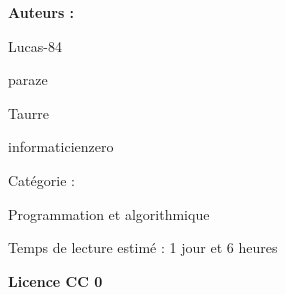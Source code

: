 \begin{titlepage}
\parindent=0pt
\vspace*{9cm}
\begin{center}\sffamily\bfseries\LARGE
Auteurs :


    Lucas-84
    
    paraze
    
    Taurre
    
    informaticienzero
    
\end{center}

\vspace*{6cm}

\begin{center}\sffamily\bfseries\Large

Catégorie :

    Programmation et algorithmique 


Temps de lecture estimé : 1 jour et 6 heures
\end{center}

\vspace*{1cm}

\begin{center}\sffamily\bfseries\large
Licence CC 0
\end{center}

\end{titlepage}